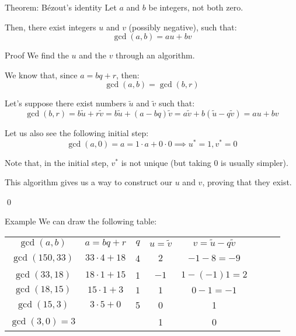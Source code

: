 \documentclass[a4paper]{article}
\begin{document}
\begin{parag}{Theorem: Bézout's identity}
    Let $a$ and $b$ be integers, not both zero. 

    Then, there exist integers $u$ and $v$ (possibly negative), such that: 
    \[\gcd\left(a, b\right) = au + bv\]
    
    \begin{subparag}{Proof}
        We find the $u$ and the $v$ through an algorithm. 

        We know that, since $a = bq + r$, then: 
        \[\gcd\left(a, b\right) = \gcd\left(b, r\right)\]
        
        Let's suppose there exist numbers $\widetilde{u}$ and $\widetilde{v}$ such that: 
        \[\gcd\left(b, r\right) = b \widetilde{u} + r\widetilde{v} = b\widetilde{u} + \left(a - bq\right)\widetilde{v} = a\widetilde{v} + b\left(\widetilde{u} - q\widetilde{v}\right) = au + bv\]
        
        Let us also see the following initial step: 
        \[\gcd\left(a, 0\right) = a = 1\cdot a + 0\cdot 0 \implies u^* = 1, v^* = 0\]
        
        Note that, in the initial step, $v^*$ is not unique (but taking 0 is usually simpler).

        This algorithm gives us a way to construct our $u$ and $v$, proving that they exist.

        \qed
    \end{subparag}

    \begin{subparag}{Example}
        We can draw the following table:
        \begin{center}
        \begin{tabular}{|c||c|c|c|c|c|c|c}
            \hline
            $\gcd\left(a, b\right)$ & $a = bq + r$ & $q$ & $u = \widetilde{v}$ & $v = \widetilde{u} - q\widetilde{v}$ \\
            \hhline{=#=|=|=|=|}
            $\gcd\left(150, 33\right)$ & $33 \cdot 4 + 18$ & 4 & $2$ & $-1 -8 = -9$\\
            \hline
            $\gcd\left(33, 18\right)$ & $18\cdot 1 + 15$ & 1 & $-1$ & $1 - \left(-1\right)1 = 2$\\
            \hline
            $\gcd\left(18, 15\right)$ & $15\cdot 1 + 3$ & $1$ & $1$ & $0 - 1 = -1$\\
            \hline
            $\gcd\left(15, 3\right)$ & $3\cdot 5 + 0$ & 5 & 0 & 1 \\
            \hline
            $\gcd\left(3, 0\right) = 3$ & & & 1 & 0 \\
            \hline
        \end{tabular}
        \end{center}


\end{subparag}
\end{parag}
\end{document}
